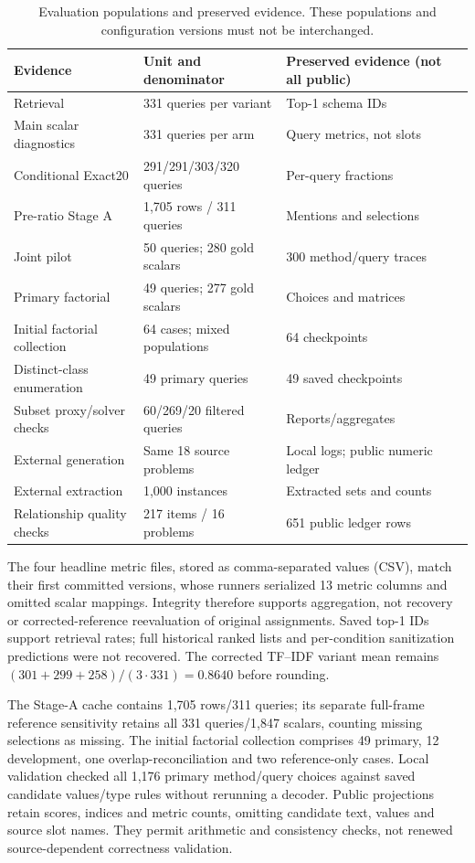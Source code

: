 \begin{table}[htbp]
\centering\small
\caption{Evaluation populations and preserved evidence. These populations
and configuration versions must not be interchanged.}
\label{tab:population-map}
\begin{tabularx}{\linewidth}{@{}lXl@{}}
\toprule
Evidence & Unit and denominator & Preserved evidence (not all public)\\
\midrule
Retrieval & 331 queries per variant & Top-1 schema IDs\\
Main scalar diagnostics & 331 queries per arm & Query metrics, not slots\\
Conditional Exact20 & 291/291/303/320 queries & Per-query fractions\\
Pre-ratio Stage A & 1,705 rows / 311 queries & Mentions and selections\\
Joint pilot & 50 queries; 280 gold scalars & 300 method/query traces\\
Primary factorial & 49 queries; 277 gold scalars & Choices and matrices\\
Initial factorial collection & 64 cases; mixed populations & 64 checkpoints\\
Distinct-class enumeration & 49 primary queries & 49 saved checkpoints\\
Subset proxy/solver checks & 60/269/20 filtered queries & Reports/aggregates\\
External generation & Same 18 source problems & Local logs; public numeric ledger\\
External extraction & 1,000 instances & Extracted sets and counts\\
Relationship quality checks & 217 items / 16 problems & 651 public ledger rows\\
\bottomrule
\end{tabularx}
\end{table}

The four headline metric files, stored as comma-separated values (CSV), match their first committed versions, whose runners serialized 13 metric columns and omitted scalar mappings. Integrity therefore supports aggregation, not recovery or corrected-reference reevaluation of original assignments. Saved top-1 IDs support retrieval rates; full historical ranked lists and per-condition sanitization predictions were not recovered. The corrected TF--IDF variant mean remains $(301+299+258)/(3\cdot331)=0.8640$ before rounding.

The Stage-A cache contains 1,705 rows/311 queries; its separate full-frame reference sensitivity retains all 331 queries/1,847 scalars, counting missing selections as missing. The initial factorial collection comprises 49 primary, 12 development, one overlap-reconciliation and two reference-only cases. Local validation checked all 1,176 primary method/query choices against saved candidate values/type rules without rerunning a decoder. Public projections retain scores, indices and metric counts, omitting candidate text, values and source slot names. They permit arithmetic and consistency checks, not renewed source-dependent correctness validation.

